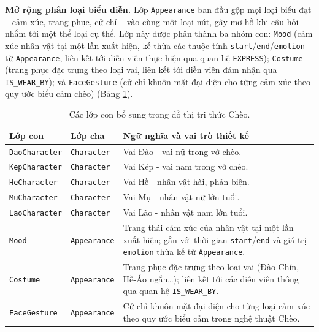 \textbf{Mở rộng phân loại biểu diễn.}
Lớp \texttt{Appearance} ban đầu gộp mọi loại biểu đạt -- cảm xúc, trang phục, cử chỉ -- vào cùng một loại nút, gây mơ hồ khi câu hỏi nhắm tới một thể loại cụ thể. Lớp này được phân thành ba nhóm con: \texttt{Mood} (cảm xúc nhân vật tại một lần xuất hiện, kế thừa các thuộc tính \texttt{start}/\texttt{end}/\texttt{emotion} từ \texttt{Appearance}, liên kết tới diễn viên thực hiện qua quan hệ \texttt{EXPRESS}); \texttt{Costume} (trang phục đặc trưng theo loại vai, liên kết tới diễn viên đảm nhận qua \texttt{IS\_WEAR\_BY}); và \texttt{FaceGesture} (cử chỉ khuôn mặt đại diện cho từng cảm xúc theo quy ước biểu cảm chèo) (Bảng \ref{tab:schema_extension}).

\begin{table}[ht!]
  \centering
  \caption{Các lớp con bổ sung trong đồ thị tri thức Chèo.}
  \label{tab:schema_extension}
  \renewcommand{\arraystretch}{1.3}
  \footnotesize
  \begin{tabular}{p{3.6cm} p{2.8cm} p{8.39cm}}
    \toprule
    \textbf{Lớp con} & \textbf{Lớp cha} & \textbf{Ngữ nghĩa và vai trò thiết kế} \\
    \midrule
    \texttt{DaoCharacter}
      & \texttt{Character}
      & Vai Đào - vai nữ trong vở chèo. \\[2pt]
    \texttt{KepCharacter}
      & \texttt{Character}
      & Vai Kép - vai nam trong vở chèo. \\[2pt]
    \texttt{HeCharacter}
      & \texttt{Character}
      & Vai Hề - nhân vật hài, phản biện. \\[2pt]
    \texttt{MuCharacter}
      & \texttt{Character}
      & Vai Mụ - nhân vật nữ lớn tuổi. \\[2pt]
    \texttt{LaoCharacter}
      & \texttt{Character}
      & Vai Lão - nhân vật nam lớn tuổi. \\[4pt]
    \texttt{Mood}
      & \texttt{Appearance}
      & Trạng thái cảm xúc của nhân vật tại một lần xuất hiện; gắn với
        thời gian \texttt{start}/\texttt{end} và giá trị
        \texttt{emotion} thừa kế từ \texttt{Appearance}. \\[2pt]
    \texttt{Costume}
      & \texttt{Appearance}
      & Trang phục đặc trưng theo loại vai (Đào-Chín, Hề-Áo ngắn\ldots);
        liên kết tới các diễn viên thông qua quan hệ \texttt{IS\_WEAR\_BY}. \\[2pt]
    \texttt{FaceGesture}
      & \texttt{Appearance}
      & Cử chỉ khuôn mặt đại diện cho từng loại cảm xúc theo quy ước
        biểu cảm trong nghệ thuật Chèo. \\
    \bottomrule
  \end{tabular}
\end{table}


